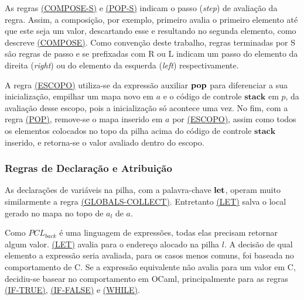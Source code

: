 As regras \hyperref[rule:pop-s]{(COMPOSE-S)} e \hyperref[rule:compose-s]{(POP-S)} indicam o passo (\emph{step}) de avaliação da regra. Assim, a composição, por exemplo, primeiro avalia o primeiro elemento até que este seja um valor, descartando esse e resultando no segunda elemento, como descreve \hyperref[rule:compose]{(COMPOSE)}. Como convenção deste trabalho, regras terminadas por S são regras de passo e se prefixadas com R ou L indicam um passo do elemento da direita (\emph{right}) ou do elemento da esquerda (\emph{left}) respectivamente.

A regra \hyperref[rule:escopo]{(ESCOPO)} utiliza-se da expressão auxiliar $\mathbf{pop}$ para diferenciar a sua inicialização, empilhar um mapa novo em $a$ e o código de controle $\mathbf{stack}$ em $p$, da avaliação desse escopo, pois a inicialização só acontece uma vez. No fim, com a regra \hyperref[rule:pop]{(POP)}, remove-se o mapa inserido em $a$ por \hyperref[rule:escopo]{(ESCOPO)}, assim como todos os elementos colocados no topo da pilha acima do código de controle $\mathbf{stack}$ inserido, e retorna-se o valor avaliado dentro do escopo.

\subsubsection{Regras de Declaração e Atribuição}
\label{sec:pcl-back:semantica:atribui}

As declarações de variáveis na pilha, com a palavra-chave $\mathbf{let}$, operam muito similarmente a regra \hyperref[rule:globals-collect]{(GLOBALS-COLLECT)}. Entretanto \hyperref[rule:let]{(LET)} salva o local gerado no mapa no topo de $a_l$ de $a$. 


Como $PCL_{back}$ é uma linguagem de expressões, todas elas precisam retornar algum valor. \hyperref[rule:let]{(LET)} avalia para o endereço alocado na pilha $l$. A decisão de qual elemento a expressão seria avaliada, para os casos menos comuns, foi baseada no comportamento de C. Se a expressão equivalente não avalia para um valor em C, decidiu-se basear no comportamento em OCaml, principalmente para as regras \hyperref[rule:if-true]{(IF-TRUE)}, \hyperref[rule:if-false]{(IF-FALSE)} e \hyperref[rule:while]{(WHILE)}.

